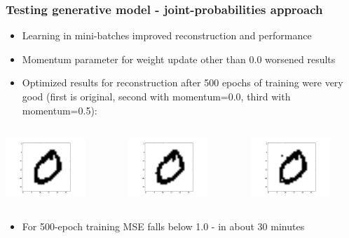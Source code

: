 \documentclass{beamer}
\begin{document}
  \begin{frame}
    \frametitle{Testing generative model - joint-probabilities approach}
    \begin{itemize}
	\item Learning in mini-batches improved reconstruction and performance
	\item Momentum parameter for weight update other than 0.0 worsened results
	\item Optimized results for reconstruction after 500 epochs of training were very good (first is original, second with momentum=0.0, third with momentum=0.5):
	\end{itemize}
	\begin{columns}
		\begin{column}{0.3\textwidth}
            \includegraphics[width=3cm]{images/0original.png}
		\end{column}
		\begin{column}{0.3\textwidth}
			\includegraphics[width=3cm]{images/0_reconstructed_momentum00.png}
		\end{column}
		\begin{column}{0.3\textwidth}
			\includegraphics[width=3cm]{images/0_reconstructed_momentum05.png}
		\end{column}
    \end{columns}
    \begin{itemize}
    \item For 500-epoch training MSE falls below 1.0 - in about 30 minutes
    \end{itemize}
  \end{frame}
\end{document}
